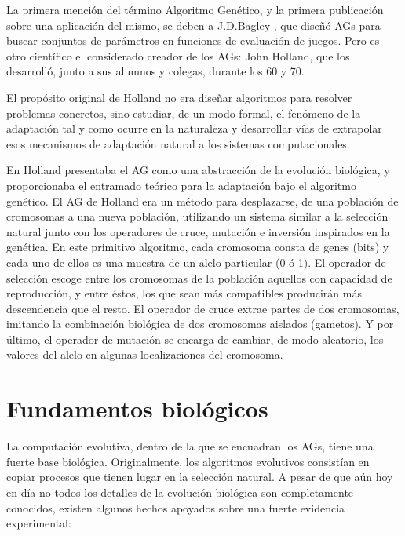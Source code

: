 \documentclass[runningheads]{llncs}
\begin{document}
La primera mención del término Algoritmo Genético, y la primera publicación
sobre una aplicación del mismo, se deben a J.D.Bagley \cite{Bagley67}, que diseñó AGs para
buscar conjuntos de parámetros en funciones de evaluación de juegos. 
Pero es otro científico el considerado creador de los AGs: John Holland, que los desarrolló, junto a sus alumnos y colegas, 
durante los 60 y 70.  

El propósito original de Holland no era diseñar algoritmos para resolver problemas concretos, sino estudiar, de un modo formal, 
el fenómeno de la adaptación tal y como ocurre en la naturaleza y desarrollar vías de extrapolar esos mecanismos de adaptación
natural a los sistemas computacionales.  

En \cite{Holland75} Holland presentaba el AG como una
abstracción de la evolución biológica, y proporcionaba el entramado teórico para la adaptación bajo el algoritmo genético. 
El AG de Holland era un método para desplazarse, de una población de cromosomas a una nueva población, utilizando
un sistema similar a la selección natural junto con los operadores de cruce, mutación e inversión inspirados en la genética. 
En este primitivo algoritmo, cada cromosoma consta de genes (bits) y cada uno de ellos es una muestra de un alelo particular (0 ó 1). 
El operador de selección escoge entre los cromosomas de la población aquellos con capacidad de reproducción, y entre éstos, 
los que sean más compatibles producirán más descendencia que el resto. El operador de cruce extrae partes de dos cromosomas,
imitando la combinación biológica de dos cromosomas aislados (gametos). Y por último, el operador de mutación se encarga de cambiar, 
de modo aleatorio, los valores del alelo en algunas localizaciones del cromosoma. 


\section{Fundamentos biológicos}

La computación evolutiva, dentro de la que se encuadran los AGs, tiene una fuerte base biológica. Originalmente, 
los algoritmos evolutivos consistían en copiar procesos que tienen lugar en la selección natural. A pesar de que 
aún hoy en día no todos los detalles de la evolución biológica son completamente conocidos, existen algunos hechos apoyados 
sobre una fuerte evidencia experimental:
\end{document}
